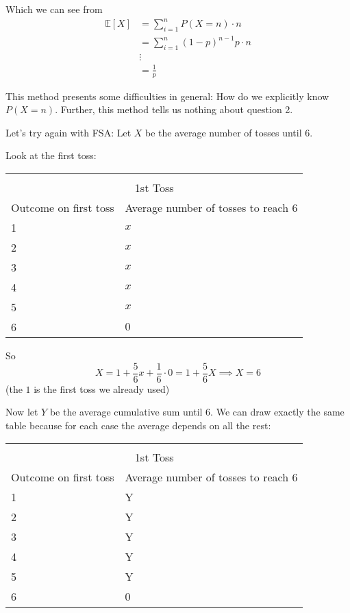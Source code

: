 \documentclass[12pt]{article}
\newcommand{\E}{\mathbb{E}}
\begin{document}
    Which we can see from 
    \begin{align*}
        \E[X] &= \sum_{i=1}^n P(X = n) \cdot n\\ 
        &= \sum_{i=1}^n (1- p)^{n-1} p \cdot n\\ 
        &\vdots\\ 
        &= \frac{1}{p}
    \end{align*}

    This method presents some difficulties in general: How do we explicitly know $P(X = n)$. Further, this method tells us nothing about question 2. 

    Let's try again with FSA: Let $X$ be the average number of tosses until 6. 

    Look at the first toss:

    \begin{center}
        \begin{tabular}{|p{1in}p{1in}|}
            \hline\\
            \multicolumn{2}{c}{1st Toss}\\ 
            Outcome on first toss & Average number of tosses to reach 6\\ 
            \hline
            1 & $x$\\ 
            2 & $x$\\ 
            3 & $x$\\ 
            4 & $x$\\ 
            5 & $x$\\ 
            6 & $0$\\ 
            \hline
        \end{tabular}
    \end{center}
   

    So 
    \[X = 1 + \frac{5}{6}x + \frac{1}{6}\cdot 0 = 1 + \frac{5}{6}X \implies \boxed{X = 6}\] 
    (the $1$ is the first toss we already used) 

    Now let $Y$ be the average cumulative sum until 6. We can draw exactly the same table because for each case the average depends on all the rest: 
    
    \begin{center}
        \begin{tabular}{|p{1in}p{1in}|}
            \hline\\
            \multicolumn{2}{c}{1st Toss}\\ 
            Outcome on first toss & Average number of tosses to reach 6\\ 
            \hline
            1 & Y\\ 
            2 & Y \\ 
            3 & Y\\ 
            4 & Y\\ 
            5 & Y\\ 
            6 & 0\\ 
            \hline
        \end{tabular}
    \end{center}
    
\end{document}
